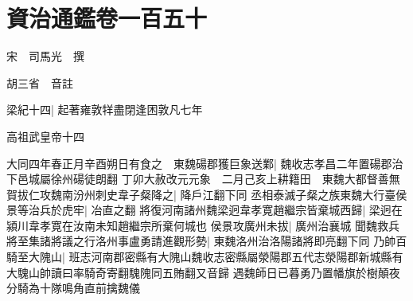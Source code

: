 \chapter{資治通鑑卷一百五十}
宋　司馬光　撰

胡三省　音註

梁紀十四|{
	起著雍敦䍧盡閉逢困敦凡七年}


高祖武皇帝十四

大同四年春正月辛酉朔日有食之　東魏碭郡獲巨象送鄴|{
	魏收志孝昌二年置碭郡治下邑城屬徐州碭徒朗翻}
丁卯大赦改元元象　二月己亥上耕籍田　東魏大都督善無賀拔仁攻魏南汾州刺史韋子粲降之|{
	降戶江翻下同}
丞相泰滅子粲之族東魏大行臺侯景等治兵於虎牢|{
	冶直之翻}
將復河南諸州魏梁迥韋孝寛趙繼宗皆棄城西歸|{
	梁迥在潁川韋孝寛在汝南未知趙繼宗所棄何城也}
侯景攻廣州未拔|{
	廣州治襄城}
聞魏救兵將至集諸將議之行洛州事盧勇請進觀形勢|{
	東魏洛州治洛陽諸將即亮翻下同}
乃帥百騎至大隗山|{
	班志河南郡密縣有大隗山魏收志密縣屬滎陽郡五代志滎陽郡新城縣有大騩山帥讀曰率騎奇寄翻騩隗同五賄翻又音歸}
遇魏師日已暮勇乃置幡旗於樹顛夜分騎為十隊鳴角直前擒魏儀

